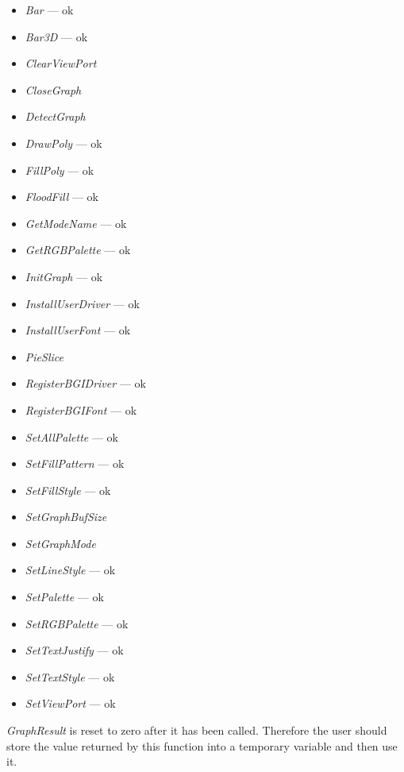 \begin{itemize}
\item \textit{Bar}                      --- ok
\item \textit{Bar3D}                    --- ok
\item \textit{ClearViewPort}
\item \textit{CloseGraph}
\item \textit{DetectGraph}
\item \textit{DrawPoly}                 --- ok
\item \textit{FillPoly}                 --- ok
\item \textit{FloodFill}                --- ok
\item \textit{GetModeName}              --- ok
\item \textit{GetRGBPalette}            --- ok
\item \textit{InitGraph}                --- ok
\item \textit{InstallUserDriver}        --- ok
\item \textit{InstallUserFont}          --- ok
\item \textit{PieSlice}
\item \textit{RegisterBGIDriver}         --- ok
\item \textit{RegisterBGIFont}           --- ok
\item \textit{SetAllPalette}             --- ok
\item \textit{SetFillPattern}            --- ok
\item \textit{SetFillStyle}              --- ok
\item \textit{SetGraphBufSize}
\item \textit{SetGraphMode}
\item \textit{SetLineStyle}                --- ok
\item \textit{SetPalette}                 --- ok
\item \textit{SetRGBPalette}              --- ok
\item \textit{SetTextJustify}             --- ok
\item \textit{SetTextStyle}               --- ok
\item \textit{SetViewPort}                 --- ok
\end{itemize}

\textit{GraphResult} is reset to zero after it has been called. Therefore
the user should store the value returned by this function into a temporary
variable and then use it.

